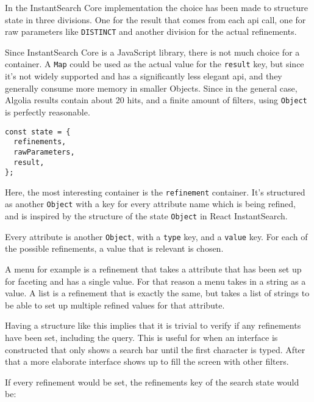 In the InstantSearch Core implementation the choice has been made to structure state in three divisions. One for the result that comes from each \acrshort{api} call, one for raw parameters like {\tt DISTINCT} and another division for the actual \glspl{refinement}.

Since InstantSearch Core is a JavaScript \gls{library}, there is not much choice for a container. A {\tt Map}\cite{mdn-map} could be used as the actual value for the {\tt result} key, but since it's not widely supported and has a significantly less elegant \acrshort{api}, and they generally consume more memory in smaller Objects. Since in the general case, Algolia results contain about 20 hits, and a finite amount of filters, using {\tt Object} is perfectly reasonable.

\begin{minipage}{\linewidth}
\begin{lstlisting}[caption={The state container of InstantSearch Core},label={lst:is-core-state-1}]
const state = {
  refinements,
  rawParameters,
  result,
};
\end{lstlisting}
\end{minipage}

Here, the most interesting container is the {\tt refinement} container. It's structured as another {\tt Object} with a key for every \gls{attribute} name which is being refined, and is inspired by the structure of the state {\tt Object} in React InstantSearch\cite{react-instantsearch-search-state}.

Every \gls{attribute} is another {\tt Object}, with a {\tt type} key, and a {\tt value} key. For each of the possible \glspl{refinement}, a value that is relevant is chosen. 

A menu for example is a \gls{refinement} that takes a \gls{attribute} that has been set up for faceting\cite{algolia-set-up-faceting} and has a single value. For that reason a menu takes in a string as a value. A list is a \gls{refinement} that is exactly the same, but takes a list of strings to be able to set up multiple refined values for that attribute.

Having a structure like this implies that it is trivial to verify if any \glspl{refinement} have been set, including the query. This is useful for when an interface is constructed that only shows a search bar until the first character is typed. After that a more elaborate interface shows up to fill the screen with other filters.

If every refinement would be set, the \glspl{refinement} key of the search state would be:

